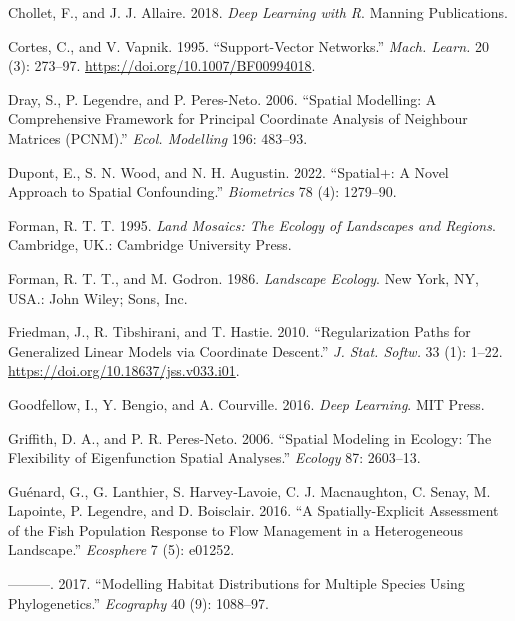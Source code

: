 \documentclass[
]{article}
\newlength{\cslhangindent}
\newenvironment{CSLReferences}[2] %
 {\begin{list}{}{%
  \setlength{\itemindent}{0pt}
  \setlength{\leftmargin}{0pt}
  \setlength{\parsep}{0pt}
  \ifodd #1
   \setlength{\leftmargin}{\cslhangindent}
   \setlength{\itemindent}{-1\cslhangindent}
  \fi
  \setlength{\itemsep}{#2\baselineskip}}}
 {\end{list}}
\begin{document}
\begin{CSLReferences}{1}{0}
Chollet, F., and J. J. Allaire. 2018. \emph{Deep Learning with {R}}.
Manning Publications.

Cortes, C., and V. Vapnik. 1995. {``Support-Vector Networks.''}
\emph{Mach. Learn.} 20 (3): 273--97.
\url{https://doi.org/10.1007/BF00994018}.

Dray, S., P. Legendre, and P. Peres-Neto. 2006. {``Spatial Modelling: A
Comprehensive Framework for Principal Coordinate Analysis of Neighbour
Matrices ({PCNM}).''} \emph{Ecol. Modelling} 196: 483--93.

Dupont, E., S. N. Wood, and N. H. Augustin. 2022. {``Spatial+: A Novel
Approach to Spatial Confounding.''} \emph{{Biometrics}} 78 (4):
1279--90.

Forman, R. T. T. 1995. \emph{Land Mosaics: The Ecology of Landscapes and
Regions}. Cambridge, UK.: Cambridge University Press.

Forman, R. T. T., and M. Godron. 1986. \emph{Landscape Ecology}. New
York, NY, USA.: John Wiley; Sons, Inc.

Friedman, J., R. Tibshirani, and T. Hastie. 2010. {``Regularization
Paths for Generalized Linear Models via Coordinate Descent.''} \emph{J.
Stat. Softw.} 33 (1): 1--22.
\url{https://doi.org/10.18637/jss.v033.i01}.

Goodfellow, I., Y. Bengio, and A. Courville. 2016. \emph{Deep Learning}.
MIT Press.

Griffith, D. A., and P. R. Peres-Neto. 2006. {``Spatial Modeling in
Ecology: The Flexibility of Eigenfunction Spatial Analyses.''}
\emph{Ecology} 87: 2603--13.

Guénard, G., G. Lanthier, S. Harvey‐Lavoie, C. J. Macnaughton, C. Senay,
M. Lapointe, P. Legendre, and D. Boisclair. 2016. {``A
Spatially-Explicit Assessment of the Fish Population Response to Flow
Management in a Heterogeneous Landscape.''} \emph{Ecosphere} 7 (5):
e01252.

---------. 2017. {``Modelling Habitat Distributions for Multiple Species
Using Phylogenetics.''} \emph{Ecography} 40 (9): 1088--97.


\end{CSLReferences}
\end{document}
